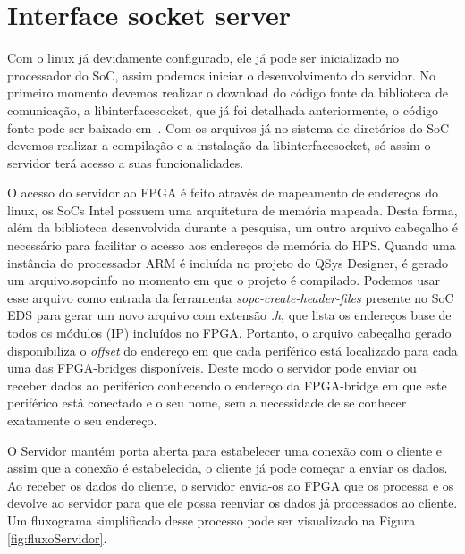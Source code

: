 \section{Interface socket server}
Com o linux já devidamente configurado, ele já pode ser inicializado no processador do SoC, assim podemos iniciar o desenvolvimento do servidor. No primeiro momento devemos realizar o download do código fonte da biblioteca de comunicação, a libinterfacesocket, que já foi detalhada anteriormente, o código fonte pode ser baixado em~\cite{interface-socket-server}. Com os arquivos já no sistema de diretórios do SoC devemos realizar a compilação e a instalação da libinterfacesocket, só assim o servidor terá acesso a suas funcionalidades. 

O acesso do servidor ao FPGA é feito através de mapeamento de endereços do linux, os SoCs Intel possuem uma arquitetura de memória mapeada. Desta forma, além da biblioteca desenvolvida durante a pesquisa, um outro arquivo cabeçalho é necessário para facilitar o acesso aos endereços de memória do HPS\@. Quando uma instância do processador ARM é incluída no projeto do QSys Designer, é gerado um arquivo.sopcinfo no momento em que o projeto é compilado. Podemos usar esse arquivo como entrada da ferramenta \textit{sopc-create-header-files} presente no SoC EDS para gerar um novo arquivo com extensão \textit{.h}, que lista os endereços base de todos os módulos (IP) incluídos no FPGA\@. Portanto, o arquivo cabeçalho gerado disponibiliza o \textit{offset} do endereço em que cada periférico está localizado para cada uma das FPGA-bridges disponíveis. Deste modo o servidor pode enviar ou receber dados ao periférico conhecendo o endereço da FPGA-bridge em que este periférico está conectado e o seu nome, sem a necessidade de se conhecer exatamente o seu endereço.

O Servidor mantém porta aberta para estabelecer uma conexão com o cliente e assim que a conexão é estabelecida, o cliente já pode começar a enviar os dados. Ao receber os dados do cliente, o servidor envia-os ao FPGA que os processa e os devolve ao servidor para que ele possa reenviar os dados já processados ao cliente. Um fluxograma simplificado desse processo pode ser visualizado na Figura \ref{fig:fluxoServidor}.

